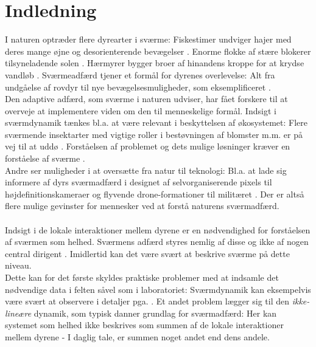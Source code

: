 \chapter{Indledning}\label{ch:introduction}

I naturen optræder flere dyrearter i sværme: Fiskestimer undviger hajer med deres mange øjne og desorienterende bevægelser \cite{fishschooling}. Enorme flokke af stære blokerer tilsyneladende solen \cite{sortsol}. Hærmyrer bygger broer af hinandens kroppe for at krydse vandløb \cite{armyants}. 
Sværmeadfærd tjener et formål for dyrenes overlevelse: Alt fra undgåelse af rovdyr til nye bevægelsesmuligheder, som eksemplificeret \cite{biofoundations}.\\
Den adaptive adfærd, som sværme i naturen udviser, har fået forskere til at overveje at implementere viden om den til menneskelige formål.
Indsigt i sværmdynamik tænkes bl.a. at være relevant i beskyttelsen af økosystemet: Flere sværmende insektarter med vigtige roller i bestøvningen af blomster m.m. er på vej til at uddø  \cite{ripinsects}. Forståelsen af problemet og dets mulige løsninger kræver en forståelse af sværme \cite{swarmdecline}. \\ Andre ser muligheder i at oversætte fra natur til teknologi: Bl.a. at lade sig informere af dyrs sværmadfærd i designet af selvorganiserende pixels til højdefinitionskameraer og flyvende drone-formationer til militæret \cite{camera}\cite{pentagon}.
Der er altså flere mulige gevinster for mennesker ved at forstå naturens sværmadfærd.\\\\
Indsigt i de lokale interaktioner mellem dyrene er en nødvendighed for forståelsen af sværmen som helhed. Sværmens adfærd styres nemlig af disse og ikke af nogen central dirigent \cite{selforganimals}.  
Imidlertid kan det være svært at beskrive sværme på dette niveau.\\ Dette kan for det første skyldes praktiske problemer med at indsamle det nødvendige data i felten såvel som i laboratoriet: Sværmdynamik kan eksempelvis være svært at observere i detaljer pga. \cite{swarmsaredifficult}. 
Et andet problem lægger sig til den \textit{ikke-lineære} dynamik, som typisk danner grundlag for sværmadfærd: Her kan systemet som helhed ikke beskrives som summen af de lokale interaktioner mellem dyrene - I daglig tale, er summen noget andet end dens andele\cite{nonlinear}\cite{swarmsarenonlinear}. 
